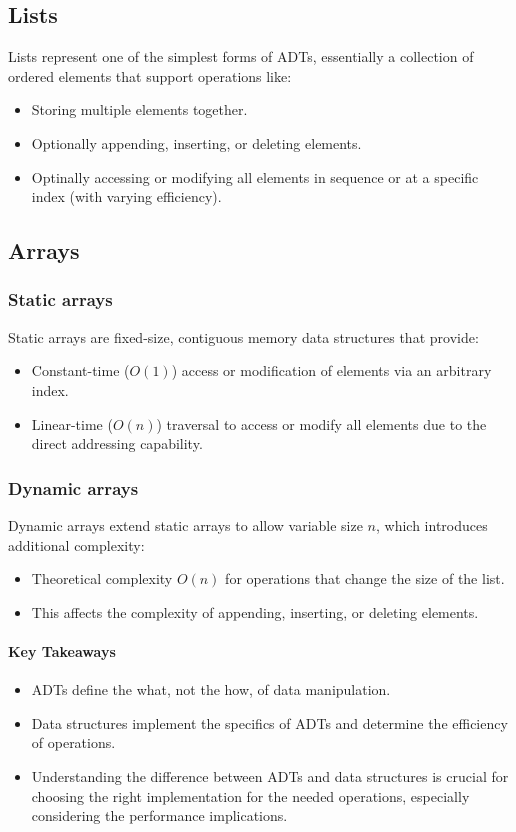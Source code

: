 \documentclass[12pt]{article}
\begin{document}
\subsection{Lists}
Lists represent one of the simplest forms of ADTs, essentially a collection of ordered elements that support operations like:
\begin{itemize}
    \item Storing multiple elements together.
    \item Optionally appending, inserting, or deleting elements.
    \item Optinally accessing or modifying all elements in sequence or at a specific index (with varying efficiency).
\end{itemize}

\subsection{Arrays}
\subsubsection{Static arrays}
Static arrays are fixed-size, contiguous memory data structures that provide:

\begin{itemize}
    \item Constant-time (\(O(1)\)) access or modification of elements via an arbitrary index.
    \item Linear-time (\(O(n)\)) traversal to access or modify all elements due to the direct addressing capability.
\end{itemize}

\subsubsection{Dynamic arrays}
Dynamic arrays extend static arrays to allow variable size \( n \), which introduces additional complexity:

\begin{itemize}
    \item Theoretical complexity \( O(n) \) for operations that change the size of the list.
    \item This affects the complexity of appending, inserting, or deleting elements.
\end{itemize}

\paragraph{Key Takeaways}
\begin{itemize}
    \item ADTs define the what, not the how, of data manipulation.
    \item Data structures implement the specifics of ADTs and determine the efficiency of operations.
    \item Understanding the difference between ADTs and data structures is crucial for choosing the right implementation for the needed operations, especially considering the performance implications.
\end{itemize}
\end{document}

